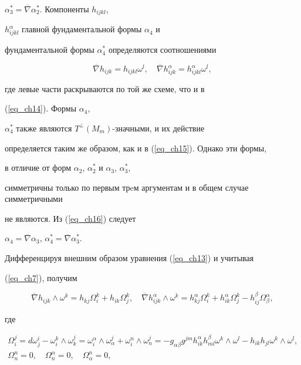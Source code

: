 $\alpha^*_3=\overline{\nabla}\alpha^*_2$. Компоненты $h_{ijkl}$,


$h^{\alpha}_{ijkl}$ главной фундаментальной формы $\alpha_4$ и


фундаментальной формы $\alpha^*_4$ определяются соотношениями


\begin{equation}


\label{eq_ch16}


\overline{\nabla}h_{ijk}=h_{ijkl}\omega^l,\quad


\overline{\nabla}h^{\alpha}_{ijk}=h^{\alpha}_{ijkl}\omega^l,


\end{equation}


где левые части раскрываются по той же схеме, что и в


(\ref{eq_ch14}). Формы $\alpha_4$,


$\alpha^*_4$ также являются $T^{\perp}(M_m)$-значными, и их действие 


определяется таким же образом, как и в (\ref{eq_ch15}). Однако эти формы, 


в отличие от форм $\alpha_2$, $\alpha^*_2$ и $\alpha_3$, $\alpha^*_3$, 


симметричны только по первым трeм аргументам и в общем случае симметричными 


не являются. Из (\ref{eq_ch16}) следует


$\alpha_4=\overline{\nabla}\alpha_3$, $\alpha^*_4=\overline{\nabla}\alpha^*_3$.





Дифференцируя внешним образом уравнения (\ref{eq_ch13}) и учитывая


(\ref{eq_ch7}), получим


$$


\overline{\nabla}h_{ijk}\wedge\omega^k=h_{kj}\Omega^k_i+h_{ik}\Omega^k_j,\quad


\overline{\nabla}h^{\alpha}_{ijk}\wedge\omega^k=h^{\alpha}_{kj}\Omega^k_i+


h^{\alpha}_{ik}\Omega^k_j-h^{\beta}_{ij}\Omega^{\alpha}_{\beta},


$$


где


\begin{equation}


\label{eq_ch18}


\begin{array}{c}


\Omega^j_i=d\omega^i_j- \omega^k_i\wedge\omega^j_k=\omega^{\alpha}_i\wedge


\omega^j_{\alpha}+\omega^n_i\wedge\omega^j_n=-g_{\alpha\beta}g^{jm}


h^{\alpha}_{ik}h^{\beta}_{ml} \omega^k\wedge\omega^l-h_{ik}h_{jl}


\omega^k\wedge\omega^l,\\[2mm]


\Omega^n_n=0,\quad\Omega^{\alpha}_n=0,\quad \Omega^n_{\alpha}=0,


\end{array}


\end{equation}


